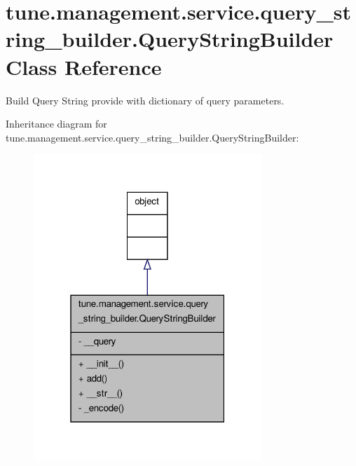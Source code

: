 \hypertarget{classtune_1_1management_1_1service_1_1query__string__builder_1_1QueryStringBuilder}{\section{tune.\-management.\-service.\-query\-\_\-string\-\_\-builder.\-Query\-String\-Builder Class Reference}
\label{classtune_1_1management_1_1service_1_1query__string__builder_1_1QueryStringBuilder}
}


Build Query String provide with dictionary of query parameters.  




Inheritance diagram for tune.\-management.\-service.\-query\-\_\-string\-\_\-builder.\-Query\-String\-Builder\-:
\nopagebreak
\begin{figure}[H]
\begin{center}
\leavevmode
\includegraphics[width=244pt]{classtune_1_1management_1_1service_1_1query__string__builder_1_1QueryStringBuilder__inherit__graph}
\end{center}
\end{figure}


